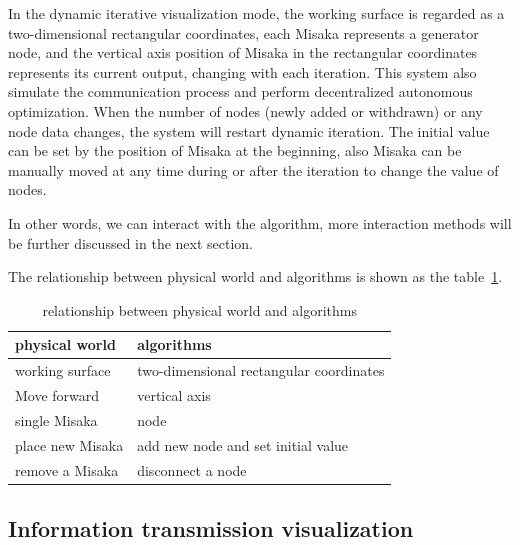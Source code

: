 \documentclass[conference]{IEEEtran}
\begin{document}
In the dynamic iterative visualization mode, the working surface is regarded as a two-dimensional rectangular coordinates, each Misaka represents a generator node, and the vertical axis position of Misaka in the rectangular coordinates represents its current output, changing with each iteration. This system also simulate the communication process and perform decentralized autonomous optimization. When the number of nodes (newly added or withdrawn) or any node data changes, the system will restart dynamic iteration. The initial value can be set by the position of Misaka at the beginning, also Misaka can be manually moved at any time during or after the iteration to change the value of nodes.

In other words, we can interact with the algorithm, more interaction methods will be further discussed in the next section.

The relationship between physical world and algorithms is shown as the table~\ref{tab:Real-Unreal}.

\begin{table}[htbp]
    \centering
    \begin{tabular}{@{}ll@{}}
    \hline
    physical world          & algorithms                               \\ \hline
    working surface         & two-dimensional rectangular coordinates  \\
    Move forward            & vertical axis                            \\
    single Misaka           & node                                     \\
    place new Misaka        & add new node and set initial value       \\
    remove a Misaka         & disconnect a node                        \\ \hline
    \end{tabular}
    \caption{relationship between physical world and algorithms}
    \label{tab:Real-Unreal}
\end{table}





\subsection{Information transmission visualization}

\end{document}
